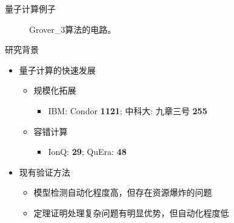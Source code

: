\documentclass[aspectratio=1610]{ctexbeamer}
\begin{document}
\begin{frame}{量子计算例子}
    \begin{figure}[h]
      \centering
      \label{fig:cir}
      \caption{Grover\_3算法的电路。}
    \end{figure}
\end{frame}
\begin{frame}{研究背景}
    \begin{itemize}
        \item<1-> 量子计算的快速发展
        \begin{itemize}
            \item 规模化拓展
            \begin{itemize}
                \item IBM: Condor \textbf{1121}; 中科大: 九章三号 \textbf{255}
            \end{itemize}
            \item 容错计算
            \begin{itemize}
                \item IonQ: \textbf{29}; QuEra:  \textbf{48}
            \end{itemize}
        \end{itemize}
        \item<2-> 现有验证方法
        \begin{itemize}
            \item 模型检测自动化程度高，但存在资源爆炸的问题
            \item 定理证明处理复杂问题有明显优势，但自动化程度低
        \end{itemize}
    \end{itemize}
\end{frame}
\end{document}
